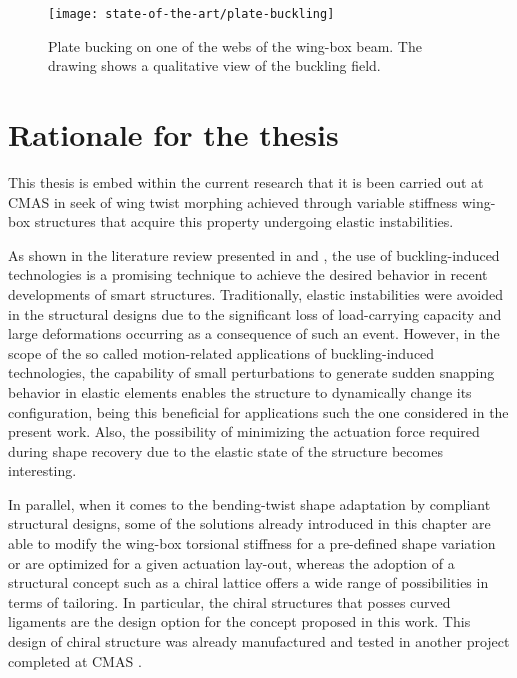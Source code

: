   \begin{figure}[!htpb]
    \centering
    \texttt{[image: state-of-the-art/plate-buckling]}
    \caption[Plate bucking on one of the webs of the wing-box beam]{Plate bucking on one of the webs of the wing-box beam. The drawing shows a qualitative view of the buckling field. \cite{Runkel2016}}\label{fig:plate-buckling}
  \end{figure}

\clearpage
\section{Rationale for the thesis} \label{sec:rationale_state}

  This thesis is embed within the current research that it is been carried out at CMAS in seek of wing twist morphing achieved through variable stiffness wing-box structures that acquire this property undergoing elastic instabilities. 

  As shown in the literature review presented in \cite{Hu2015} and \cite{Reis2015}, the use of buckling-induced technologies is a promising technique to achieve the desired behavior in recent developments of smart structures. Traditionally, elastic instabilities were avoided in the structural designs due to the significant loss of load-carrying capacity and large deformations occurring as a consequence of such an event. However, in the scope of the so called motion-related applications of buckling-induced technologies, the capability of small perturbations to generate sudden snapping behavior in elastic elements enables the structure to dynamically change its configuration, being this beneficial for applications such the one considered in the present work. Also, the possibility of minimizing the actuation force required during shape recovery due to the elastic state of the structure becomes interesting.

  In parallel, when it comes to the bending-twist shape adaptation by compliant structural designs, some of the solutions already introduced in this chapter are able to modify the wing-box torsional stiffness for a pre-defined shape variation or are optimized for a given actuation lay-out, whereas the adoption of a structural concept such as a chiral lattice offers a wide range of possibilities in terms of tailoring. In particular, the chiral structures that posses curved ligaments are the design option for the concept proposed in this work. This design of chiral structure was already manufactured and tested in another project completed at CMAS \cite{Vincenz2017}.

